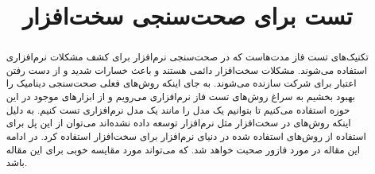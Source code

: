 \documentclass[conference]{IEEEtran}
\begin{document}
\title{تست
برای صحت‌سنجی سخت‌افزار
}

\author{
}

\maketitle

\begin{abstract}
تکنیک‌های تست فاز مدت‌هاست که در صحت‌سنجی نرم‌افزار برای کشف مشکلات نرم‌افزاری
استفاده می‌شوند. مشکلات سخت‌افزار دائمی هستند و باعث خسارات شدید و از دست
رفتن اعتبار برای شرکت سازنده می‌شوند. به جای اینکه روش‌های فعلی صحت‌سنجی دینامیک
را بهبود بخشیم به سراغ روش‌های تست فاز نرم‌افزاری می‌رویم و از ابزار‌های موجود
در این حوزه استفاده می‌کنیم تا بتوانیم یک مدل
را مانند یک مدل نرم‌افزاری تست کنیم. به دلیل اینکه روش‌های
در سخت‌افزار مثل نرم‌افزار توسعه داده نشده‌اند می‌توان از این پل برای استفاده از روش‌های
استفاده شده در دنیای نرم‌افزار برای سخت‌افزار استفاده کرد. در ادامه این مقاله
در مورد فازور
صحبت خواهد شد.
که می‌تواند مورد مقایسه خوبی برای این مقاله باشد.
\end{abstract}

\end{document}
